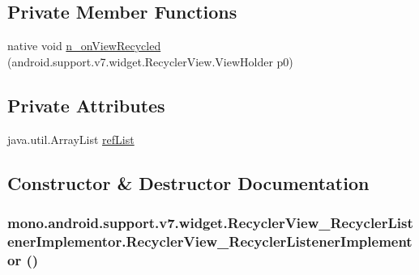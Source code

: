 \subsection*{Private Member Functions}
\begin{CompactItemize}
\item 
native void \hyperlink{classmono_1_1android_1_1support_1_1v7_1_1widget_1_1_recycler_view___recycler_listener_implementor_1a1066ed5d8a034c04ea676c81b05e6e}{n\_\-onViewRecycled} (android.support.v7.widget.RecyclerView.ViewHolder p0)
\end{CompactItemize}
\subsection*{Private Attributes}
\begin{CompactItemize}
\item 
java.util.ArrayList \hyperlink{classmono_1_1android_1_1support_1_1v7_1_1widget_1_1_recycler_view___recycler_listener_implementor_63a1dcf6ee5657adb40e147518c02d5b}{refList}
\end{CompactItemize}


\subsection{Constructor \& Destructor Documentation}
\hypertarget{classmono_1_1android_1_1support_1_1v7_1_1widget_1_1_recycler_view___recycler_listener_implementor_faa895f4a195a43055b9f9e921470743}{
\subsubsection[{RecyclerView\_\-RecyclerListenerImplementor}]{\setlength{\rightskip}{0pt plus 5cm}mono.android.support.v7.widget.RecyclerView\_\-RecyclerListenerImplementor.RecyclerView\_\-RecyclerListenerImplementor ()}}
\label{classmono_1_1android_1_1support_1_1v7_1_1widget_1_1_recycler_view___recycler_listener_implementor_faa895f4a195a43055b9f9e921470743}





